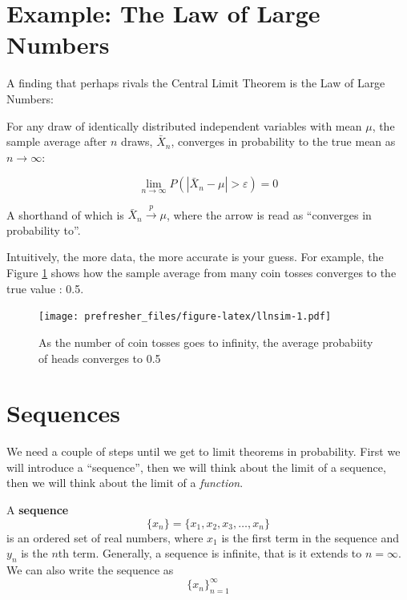 \documentclass[]{book}
\theoremstyle{definition}
\theoremstyle{definition}
\theoremstyle{definition}
\theoremstyle{remark}
\let\BeginKnitrBlock\begin \let\EndKnitrBlock\end
\begin{document}
\hypertarget{example-the-law-of-large-numbers}{%
\section*{Example: The Law of Large Numbers}\label{example-the-law-of-large-numbers}}

A finding that perhaps rivals the Central Limit Theorem is the Law of Large Numbers:

\BeginKnitrBlock{theorem}[(Weak) Law of Large Numbers]
\protect\hypertarget{thm:lln-lim}{}{\label{thm:lln-lim} {} }For any draw of identically distributed independent variables with mean \(\mu\), the sample average after \(n\) draws, \(\bar{X}_n\), converges in probability to the true mean as \(n \rightarrow \infty\):

\[\lim\limits_{n\to \infty} P(|\bar{X}_n - \mu | > \varepsilon) = 0\]

A shorthand of which is \(\bar{X}_n \xrightarrow{p} \mu\), where the arrow is read as ``converges in probability to''.
\EndKnitrBlock{theorem}

Intuitively, the more data, the more accurate is your guess. For example, the Figure \ref{fig:llnsim} shows how the sample average from many coin tosses converges to the true value : 0.5.

\begin{figure}
\centering
\texttt{[image: prefresher\_files/figure-latex/llnsim-1.pdf]}
\caption{\label{fig:llnsim}As the number of coin tosses goes to infinity, the average probabiity of heads converges to 0.5}
\end{figure}

\hypertarget{sequences}{%
\section{Sequences}\label{sequences}}

We need a couple of steps until we get to limit theorems in probability. First we will introduce a ``sequence'', then we will think about the limit of a sequence, then we will think about the limit of a \emph{function}.

A \textbf{sequence} \[\{x_n\}=\{x_1, x_2, x_3, \ldots, x_n\}\] is an ordered set of real numbers, where \(x_1\) is the first term in the sequence and \(y_n\) is the \(n\)th term. Generally, a sequence is infinite, that is it extends to \(n=\infty\). We can also write the sequence as \[\{x_n\}^\infty_{n=1}\]
\end{document}

